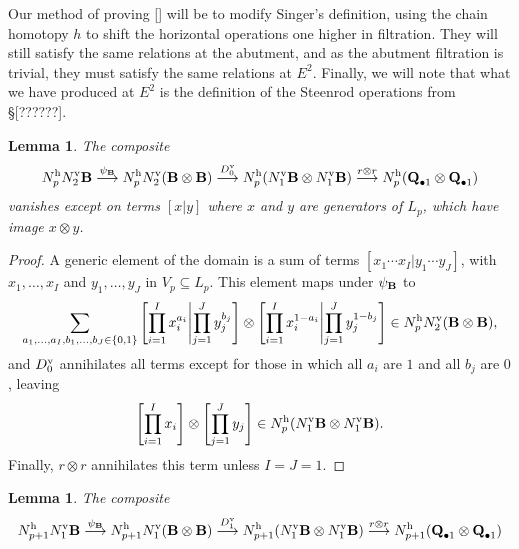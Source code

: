 \documentclass[11pt]{amsart}
\theoremstyle{plain}
\newtheorem{lem}[thm]{Lemma}
\theoremstyle{definition}
\renewcommand{\to}{\longrightarrow}
\theoremstyle{plain}
\begin{document}
\begin{appendices}
Our method of proving [] will be to modify Singer's definition, using the chain homotopy $h$ to shift the horizontal operations one higher in filtration. They will still satisfy the same relations at the abutment, and as the abutment filtration is trivial, they must satisfy the same relations at $E^2$. Finally, we will note that what we have produced at $E^2$ is the definition of the Steenrod operations from \S[??????].
\begin{lem}\label{firstCompositeLemma}
The composite
\[N_{p}^\textup{h}N_2^\textup{v}\textup{\textbf{B}}\overset{\psi_{\textup{\textbf{B}}}}{\to} N_{p}^\textup{h}N_2^\textup{v}(\textup{\textbf{B}}\otimes\textup{\textbf{B}}) \overset{D_0^\textup{v}}{\to} N_{p}^\textup{h}(N_1^\textup{v}\textup{\textbf{B}}\otimes N_1^\textup{v}\textup{\textbf{B}})\overset{r\otimes r}{\to}N^\textup{h}_p(\textup{\textbf{Q}}_{\bullet 1}\otimes \textup{\textbf{Q}}_{\bullet 1})\]
vanishes except on terms $[x|y]$ where $x$ and $y$ are generators of $ L_p$, which have image $x\otimes y$.
\end{lem}
\begin{proof}
A generic element of the domain is a sum of terms $[x_1\cdots x_I|y_1\cdots y_J]$, with $x_1,\ldots,x_I$ and $y_1,\ldots,y_J$ in $V_p\subseteq L_p$. This element maps under $\psi_{\textup{\textbf{B}}}$ to
\[\sum_{\smash{a_1,\ldots,a_I,b_1,\ldots,b_J\in\{0,1\}}}
\left[\prod_{i=1}^Ix_i^{a_i}\middle|\prod_{\smash{j=1}}^Jy_j^{b_j}\right]\otimes
\left[\prod_{i=1}^Ix_i^{1-a_i}\middle|\prod_{\smash{j=1}}^Jy_j^{1-b_j}\right]
\in N_{p}^\textup{h}N_2^\textup{v}(\textup{\textbf{B}}\otimes\textup{\textbf{B}}),
\]
and $D_0^\textup{v}$ annihilates all terms except for those in which all $a_i$ are $1$ and all $b_j$ are $0$, leaving
\[\left[\prod_{i=1}^Ix_i\right]\otimes
\left[\prod_{\smash{j=1}}^Jy_j\right]\in N_{p}^\textup{h}(N_1^\textup{v}\textup{\textbf{B}}\otimes N_1^\textup{v}\textup{\textbf{B}}).\]
Finally, $r\otimes r$ annihilates this term unless $I=J=1$.
\end{proof}
\begin{lem}\label{secondCompositeLemma}
The composite
\[N_{p+1}^\textup{h} N_1^\textup{v}\textup{\textbf{B}}\overset{\psi_{\textup{\textbf{B}}}}{\to} N_{p+1}^\textup{h}N_1^\textup{v}(\textup{\textbf{B}}\otimes\textup{\textbf{B}}) \overset{D_1^\textup{v}}{\to} N_{p+1}^\textup{h}(N_1^\textup{v}\textup{\textbf{B}}\otimes N_1^\textup{v}\textup{\textbf{B}})\overset{r\otimes r}{\to}N^\textup{h}_{p+1}(\textup{\textbf{Q}}_{\bullet 1}\otimes \textup{\textbf{Q}}_{\bullet 1})\]

\end{lem}
\end{appendices}
\end{document}
